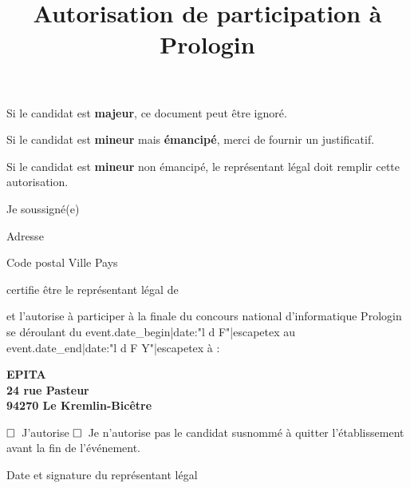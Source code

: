 \documentclass[a4paper,11pt]{prologin}
\title{Autorisation de participation à Prologin}
\newcommand\checkbox{$\Huge\square$~}
\begin{document}
\begin{tcolorbox}
Si le candidat est \textbf{majeur}, ce document peut être ignoré.

Si le candidat est \textbf{mineur} mais \textbf{émancipé}, merci de fournir un justificatif.

Si le candidat est \textbf{mineur} non émancipé, le représentant légal doit remplir cette autorisation.
\end{tcolorbox}
\vspace{2.5\baselineskip}

Je soussigné(e) \hrulefill

Adresse \hrulefill

Code postal \hrulefill{} Ville \hrulefill\hrulefill\hrulefill{} Pays \hrulefill\hrulefill

certifie être le représentant légal de \hrulefill

et l'autorise à participer à la finale du concours national d'informatique Prologin se déroulant
du {{ event.date_begin|date:"l d F"|escapetex }} au {{ event.date_end|date:"l d F Y"|escapetex }} à :

\begin{center}
    \textbf{EPITA}\\
    \textbf{24 rue Pasteur}\\
    \textbf{94270 Le Kremlin-Bicêtre}
\end{center}

\checkbox J'autorise\hspace{1em} \checkbox Je n'autorise pas\hspace{1em}
le candidat susnommé à quitter l'établissement avant la fin de l'événement.

\begin{signatureframe}{Date et signature du représentant légal}\end{signatureframe}
\end{document}
